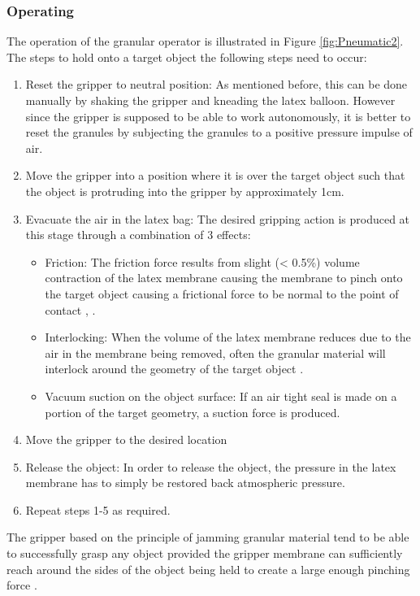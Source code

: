 \documentclass[11pt,twocolumn]{article}
\begin{document}
\subsubsection{Operating }
The operation of the granular operator is illustrated in Figure \ref{fig:Pneumatic2}. The steps to hold onto a target object the following steps need to occur:
\begin{enumerate}
\item Reset the gripper to neutral position: As mentioned before, this can be done manually by shaking the gripper and kneading the latex balloon. However since the gripper is supposed to be able to work autonomously, it is better to reset the granules by subjecting the granules to a positive pressure impulse of air.
\item Move the gripper into a position where it is over the target object such that the object is protruding into the gripper by approximately 1cm.
\item Evacuate the air in the latex bag: The desired gripping action is produced at this stage through a combination of 3 effects:
\begin{itemize}
\item Friction: The friction force results from slight (< 0.5\%) volume contraction of the latex membrane causing the membrane to pinch onto the target object causing a frictional force to be normal to the point of contact \cite{amend2012positive}, \cite{brown2010universal}.
\item Interlocking: When the volume of the latex membrane reduces due to the air in the membrane being removed, often the granular material will interlock around the geometry of the target object \cite{brown2010universal}.
\item Vacuum suction on the object surface: If an air tight seal is made on a portion of the target geometry, a suction force is produced.
\end{itemize} 
\item Move the gripper to the desired location
\item Release the object: In order to release the object, the pressure in the latex membrane has to simply be restored back atmospheric pressure.
\item Repeat steps 1-5 as required.  
\end{enumerate}
The gripper based on the principle of jamming granular material tend to be able to successfully grasp any object provided the gripper membrane can sufficiently reach around the sides of the object being held to create a large enough pinching force \cite{brown2010universal}. 
\end{document}
